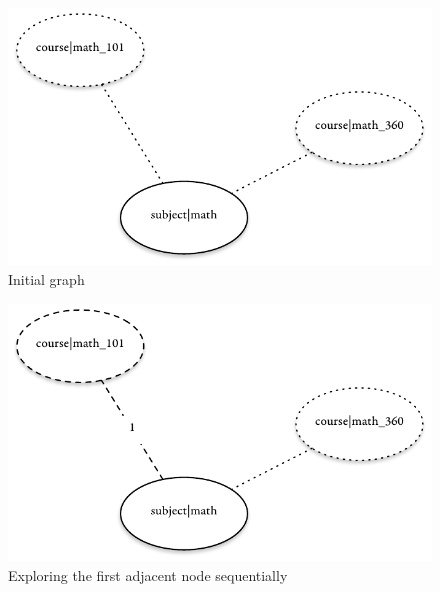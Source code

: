 			\begin{figure}
				\centering
				\includegraphics[scale=0.9]{figures/graphs/concurrent/initial}
				
				\caption{Initial graph}
				\label{fig:concurrent-initial}
			\end{figure}
			
			\begin{figure}
				\centering
				\includegraphics[scale=0.9]{figures/graphs/concurrent/sequential}
				
				\caption{Exploring the first adjacent node sequentially}
				\label{fig:concurrent-sequential}
			\end{figure}
			
